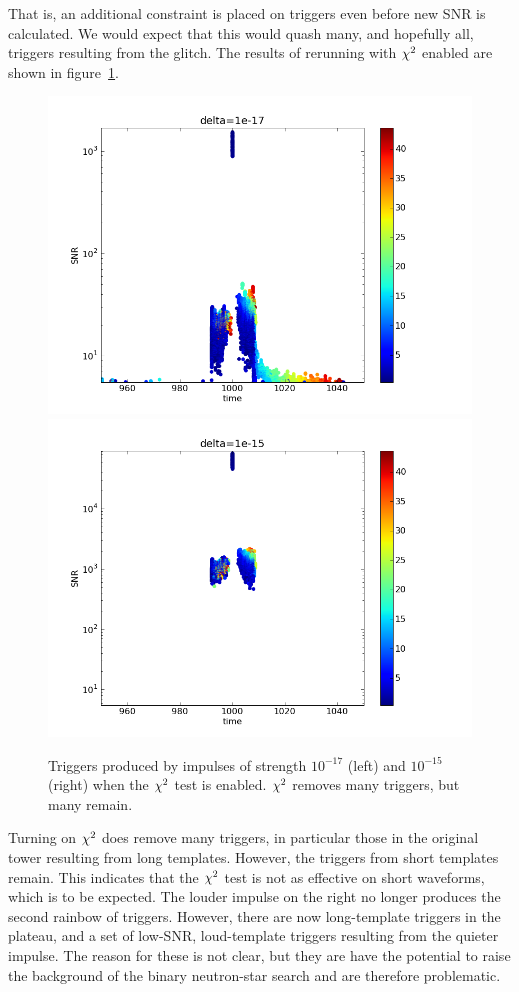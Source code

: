 That is, an additional constraint is placed on triggers even before
new SNR is calculated.  We would expect that this would quash many,
and hopefully all, triggers resulting from the glitch.  The results of
rerunning with $\chisq$ enabled are shown in
figure~\ref{f:impulses_original_chisq}.

\begin{figure}
  \includegraphics[width=0.5\linewidth]{figures/detchar/delta_chisq_1e-17}
  \includegraphics[width=0.5\linewidth]{figures/detchar/delta_chisq_1e-15}
  \caption[Triggers produced by loud impulses with $\chisq$ enabled] {
  \label{f:impulses_original_chisq}
Triggers produced by impulses of strength $10^{-17}$ (left) and
$10^{-15}$ (right) when the $\chisq$ test is enabled.  $\chisq$
removes many triggers, but many remain.
}
\end{figure}%

Turning on $\chisq$ does remove many triggers, in particular those in
the original tower resulting from long templates.  However, the
triggers from short templates remain.  This indicates that the
$\chisq$ test is not as effective on short waveforms, which is to be
expected.  The louder impulse on the right no longer produces the
second rainbow of triggers.  However, there are now long-template
triggers in the plateau, and a set of low-SNR, loud-template triggers
resulting from the quieter impulse.  The reason for these is not
clear, but they are have the potential to raise the background of the
binary neutron-star search and are therefore problematic.

